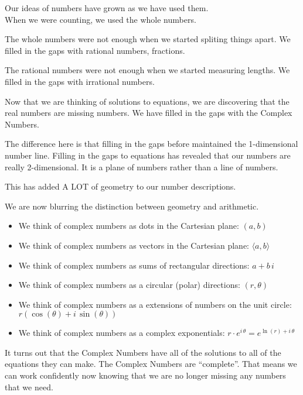 \documentclass{ximera}
\begin{document}
Our ideas of numbers have grown as we have used them. \\

When we were counting, we used the whole numbers.

The whole numbers were not enough when we started spliting things apart.  We filled in the gaps with rational numbers, fractions.

The rational numbers were not enough when we started measuring lengths. We filled in the gaps with irrational numbers.

Now that we are thinking of solutions to equations, we are discovering that the real numbers are missing numbers.  We have filled in the gaps with the Complex Numbers.

The difference here is that filling in the gaps before maintained the 1-dimensional number line.  Filling in the gaps to equations has revealed that our numbers are really 2-dimensional.  It is a plane of numbers rather than a line of numbers.

This has added A LOT of geometry to our number descriptions.

We are now blurring the distinction between geometry and arithmetic.

\begin{itemize}
\item We think of complex numbers as dots in the Cartesian plane:  $(a, b)$
\item We think of complex numbers as vectors in the Cartesian plane:  $\langle a, b \rangle$
\item We think of complex numbers as sums of rectangular directions:  $a + b \, i$
\item We think of complex numbers as a circular (polar) directions:  $(r, \theta)$
\item We think of complex numbers as a extensions of numbers on the unit circle:  $r(\cos(\theta)+i \, \sin(\theta))$
\item We think of complex numbers as a complex exponentials:  $r\cdot e^{i\, \theta} = e^{\ln(r)+i\, \theta}$
\end{itemize}


It turns out that the Complex Numbers have all of the solutions to all of the equations they can make.  The Complex Numbers are ``complete''.  That means we can work confidently now knowing that we are no longer missing any numbers that we need.
\end{document}
